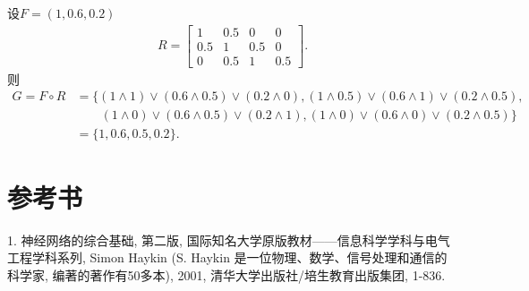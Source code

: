 \begin{example}
设$F=(1, 0.6, 0.2)$
\begin{align}
  R=\left[
  \begin{array}{cccc}
  {1} & {0.5} & {0} & {0} \\
  {0.5} & {1} & {0.5} & {0} \\
  {0} & {0.5} & {1} & {0.5}
  \end{array}
  \right].
\end{align}
则
\begin{align*}
  G=F\circ R&=\{(1\wedge 1)\vee (0.6\wedge 0.5)\vee (0.2\wedge 0), (1\wedge 0.5)\vee (0.6\wedge 1)\vee (0.2\wedge 0.5),\\
            &\qquad  (1\wedge 0)\vee (0.6\wedge 0.5)\vee (0.2\wedge 1), (1\wedge 0)\vee (0.6\wedge 0)\vee (0.2\wedge 0.5)\}\\
            & =\{1, 0.6, 0.5, 0.2\}.
\end{align*}
\vspace{-0.3cm}
\end{example}
\section{参考书}

1. 神经网络的综合基础, 第二版,  国际知名大学原版教材——信息科学学科与电气工程学科系列, Simon Haykin (S. Haykin 是一位物理、数学、信号处理和通信的科学家, 编著的著作有50多本), 2001, 清华大学出版社/培生教育出版集团, 1-836.
